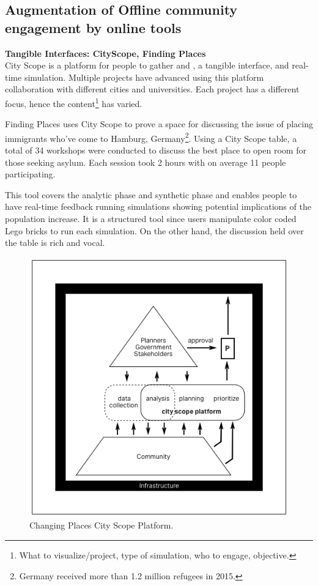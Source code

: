 \subsection{Augmentation of Offline community engagement by online tools}

\textbf{Tangible Interfaces: CityScope, Finding Places}\\
City Scope is a platform for people to gather and , a tangible interface, and real-time simulation. Multiple projects have advanced using this platform collaboration with different cities and universities. Each project has a different focus, hence the content\footnote{What to visualize/project, type of simulation, who to engage, objective.} has varied.

Finding Places uses City Scope to prove a space for discussing the issue of placing immigrants who’ve come to Hamburg, Germany\footnote{Germany received more than 1.2 million refugees in 2015.}. Using a City Scope table, a total of 34 workshops were conducted to discuss the best place to open room for those seeking asylum. Each session took 2 hours with on average 11 people participating.

This tool covers the analytic phase and synthetic phase and enables people to have real-time feedback running simulations showing potential implications of the population increase. It is a structured tool since users manipulate color coded Lego bricks to run each simulation. On the other hand, the discussion held over the table is rich and vocal.

\begin{figure}[htb]
  \includegraphics[width=\textwidth]{chapters/3/fig/cityscope.png}               
  \caption[diagram: cityscope]{Changing Places City Scope Platform.}
  \label{fig:diagram_cityscope}
\end{figure}

